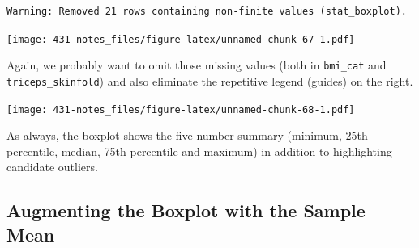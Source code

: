 \documentclass[
]{book}
\newenvironment{Shaded}{\begin{snugshade}}{\end{snugshade}}
\newcommand{\DataTypeTok}[1]{\textcolor[rgb]{0.13,0.29,0.53}{#1}}
\newcommand{\KeywordTok}[1]{\textcolor[rgb]{0.13,0.29,0.53}{\textbf{#1}}}
\newcommand{\NormalTok}[1]{#1}
\newcommand{\OperatorTok}[1]{\textcolor[rgb]{0.81,0.36,0.00}{\textbf{#1}}}
\newcommand{\OtherTok}[1]{\textcolor[rgb]{0.56,0.35,0.01}{#1}}
\newcommand{\StringTok}[1]{\textcolor[rgb]{0.31,0.60,0.02}{#1}}
\begin{document}
\begin{verbatim}
Warning: Removed 21 rows containing non-finite values (stat_boxplot).
\end{verbatim}

\texttt{[image: 431-notes\_files/figure-latex/unnamed-chunk-67-1.pdf]}

Again, we probably want to omit those missing values (both in \texttt{bmi\_cat} and \texttt{triceps\_skinfold}) and also eliminate the repetitive legend (guides) on the right.

\begin{Shaded}
\end{Shaded}

\texttt{[image: 431-notes\_files/figure-latex/unnamed-chunk-68-1.pdf]}

As always, the boxplot shows the five-number summary (minimum, 25th percentile, median, 75th percentile and maximum) in addition to highlighting candidate outliers.

\hypertarget{augmenting-the-boxplot-with-the-sample-mean}{%
\subsection{Augmenting the Boxplot with the Sample Mean}\label{augmenting-the-boxplot-with-the-sample-mean}}
\end{document}
